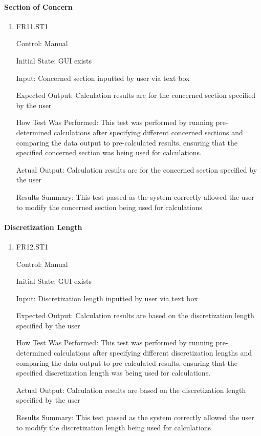 \documentclass[12pt, titlepage]{article}
\begin{document}
\paragraph{Section of Concern}

\begin{enumerate}

  \item{FR11.ST1\\}

  Control: Manual
            
  Initial State: GUI exists
            
  Input: Concerned section inputted by user via text box
            
  Expected Output: Calculation results are for the concerned section specified by the user
            
  How Test Was Performed: This test was performed by running pre-determined calculations after specifying different concerned sections and comparing the data output to pre-calculated results, ensuring that the specified concerned section was being used for calculations.
					
  Actual Output: Calculation results are for the concerned section specified by the user

  Results Summary: This test passed as the system correctly allowed the user to modify the concerned section being used for calculations

 \end{enumerate}

\paragraph{Discretization Length}

\begin{enumerate}

  \item{FR12.ST1\\}

  Control: Manual
					
  Initial State: GUI exists
					
  Input: Discretization length inputted by user via text box
					
  Expected Output: Calculation results are based on the discretization length specified by the user

  How Test Was Performed: This test was performed by running pre-determined calculations after specifying different discretization lengths and comparing the data output to pre-calculated results, ensuring that the specified discretization length was being used for calculations. 

  Actual Output: Calculation results are based on the discretization length specified by the user

  Results Summary: This test passed as the system correctly allowed the user to modify the discretization length being used for calculations

\end{enumerate}
\end{document}
